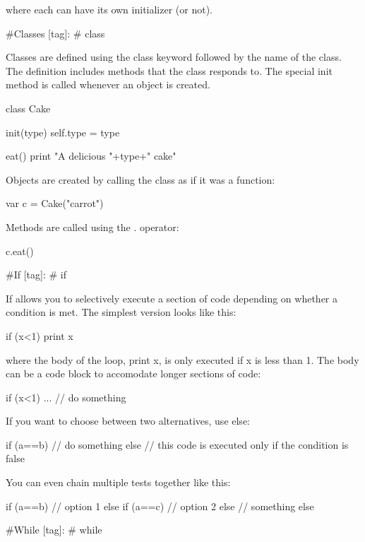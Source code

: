 where each can have its own initializer (or not).

\#\+Classes \mbox{[}tag\mbox{]}\+: \# class

Classes are defined using the {\ttfamily class} keyword followed by the name of the class. The definition includes methods that the class responds to. The special {\ttfamily init} method is called whenever an object is created. \begin{DoxyVerb}class Cake {
    init(type) {
        self.type = type
    }

    eat() {
        print "A delicious "+type+" cake"
    }
}
\end{DoxyVerb}


Objects are created by calling the class as if it was a function\+: \begin{DoxyVerb}var c = Cake("carrot")
\end{DoxyVerb}


Methods are called using the . operator\+: \begin{DoxyVerb}c.eat()
\end{DoxyVerb}


\#\+If \mbox{[}tag\mbox{]}\+: \# if

If allows you to selectively execute a section of code depending on whether a condition is met. The simplest version looks like this\+: \begin{DoxyVerb}if (x<1) print x
\end{DoxyVerb}


where the body of the loop, {\ttfamily print x}, is only executed if x is less than 1. The body can be a code block to accomodate longer sections of code\+: \begin{DoxyVerb}if (x<1) {
    ... // do something
}
\end{DoxyVerb}


If you want to choose between two alternatives, use {\ttfamily else}\+: \begin{DoxyVerb}if (a==b) {
    // do something
} else {
    // this code is executed only if the condition is false 
}
\end{DoxyVerb}


You can even chain multiple tests together like this\+: \begin{DoxyVerb}if (a==b) { 
    // option 1 
} else if (a==c) {
    // option 2 
} else {
    // something else 
}
\end{DoxyVerb}


\#\+While \mbox{[}tag\mbox{]}\+: \# while

